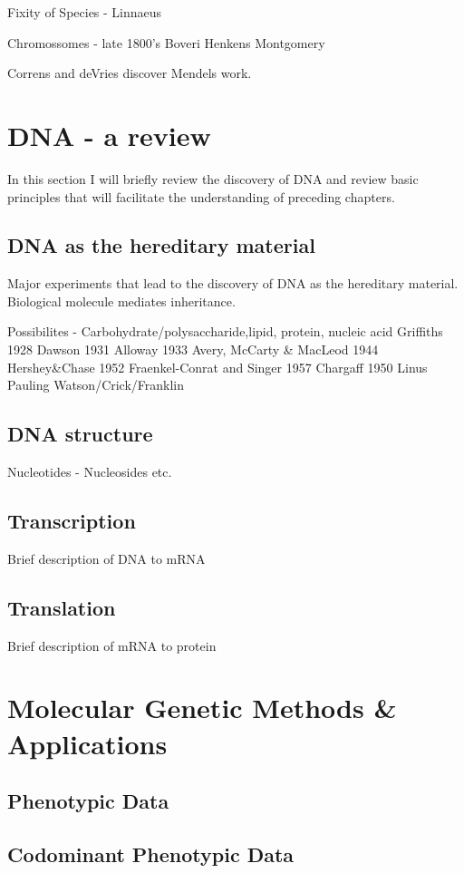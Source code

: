 \documentclass[11pt, oneside]{article}
\begin{document}
 Fixity of Species - Linnaeus 
 
 Chromossomes - late 1800's 
 Boveri
 Henkens
 Montgomery
 
 Correns and deVries discover Mendels work. 

\section{DNA - a review}
In this section I will briefly review the discovery of DNA and review basic principles that will facilitate the 
understanding of preceding chapters. 
\subsection{DNA as the hereditary material}
Major experiments that lead to the discovery of DNA as the hereditary material. 
Biological molecule mediates inheritance. 

Possibilites - Carbohydrate/polysaccharide,lipid, protein, nucleic acid
Griffiths 1928
Dawson 1931
Alloway 1933
Avery, McCarty \& MacLeod 1944
Hershey\&Chase 1952
Fraenkel-Conrat and Singer 1957
Chargaff 1950
Linus Pauling
Watson/Crick/Franklin
\subsection{DNA structure}
Nucleotides - Nucleosides etc. 
\subsection{Transcription}
Brief description of DNA to mRNA
\subsection{Translation}
Brief description of mRNA to protein

\section{Molecular Genetic Methods \& Applications}

\subsection{Phenotypic Data}

\subsection{Codominant Phenotypic Data}
\end{document}
